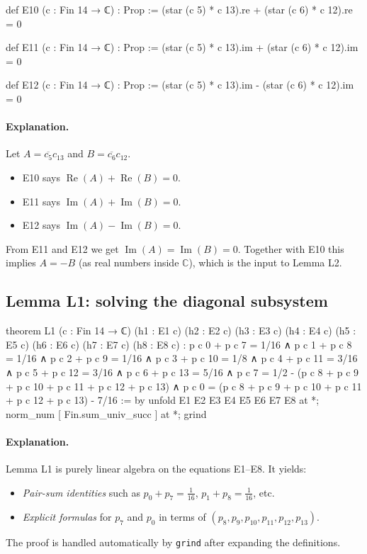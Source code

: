 \documentclass[11pt]{article}
\begin{document}
\begin{LeanCode}
def E10 (c : Fin 14 → ℂ) : Prop :=
  (star (c 5) * c 13).re + (star (c 6) * c 12).re = 0

def E11 (c : Fin 14 → ℂ) : Prop :=
  (star (c 5) * c 13).im + (star (c 6) * c 12).im = 0

def E12 (c : Fin 14 → ℂ) : Prop :=
  (star (c 5) * c 13).im - (star (c 6) * c 12).im = 0
\end{LeanCode}

\paragraph{Explanation.}
Let $A=\overline{c_5}c_{13}$ and $B=\overline{c_6}c_{12}$.
\begin{itemize}
\item E10 says $\operatorname{Re}(A)+\operatorname{Re}(B)=0$.
\item E11 says $\operatorname{Im}(A)+\operatorname{Im}(B)=0$.
\item E12 says $\operatorname{Im}(A)-\operatorname{Im}(B)=0$.
\end{itemize}
From E11 and E12 we get $\operatorname{Im}(A)=\operatorname{Im}(B)=0$.
Together with E10 this implies $A=-B$ (as real numbers inside $\mathbb{C}$), which is the input to Lemma L2.

\subsection*{Lemma L1: solving the diagonal subsystem}

\begin{LeanCode}
theorem L1 (c : Fin 14 → ℂ)
  (h1 : E1 c) (h2 : E2 c) (h3 : E3 c) (h4 : E4 c)
  (h5 : E5 c) (h6 : E6 c) (h7 : E7 c) (h8 : E8 c) :
  p c 0 + p c 7 = 1/16 ∧
  p c 1 + p c 8 = 1/16 ∧
  p c 2 + p c 9 = 1/16 ∧
  p c 3 + p c 10 = 1/8 ∧
  p c 4 + p c 11 = 3/16 ∧
  p c 5 + p c 12 = 3/16 ∧
  p c 6 + p c 13 = 5/16 ∧
  p c 7 = 1/2 - (p c 8 + p c 9 + p c 10 + p c 11 + p c 12 + p c 13) ∧
  p c 0 = (p c 8 + p c 9 + p c 10 + p c 11 + p c 12 + p c 13) - 7/16 := by
  unfold E1 E2 E3 E4 E5 E6 E7 E8 at *; norm_num [ Fin.sum_univ_succ ] at *;
  grind
\end{LeanCode}

\paragraph{Explanation.}
Lemma L1 is purely linear algebra on the equations E1--E8.
It yields:
\begin{itemize}
\item \emph{Pair-sum identities} such as $p_0+p_7=\frac1{16}$, $p_1+p_8=\frac1{16}$, etc.
\item \emph{Explicit formulas} for $p_7$ and $p_0$ in terms of $(p_8,p_9,p_{10},p_{11},p_{12},p_{13})$.
\end{itemize}
The proof is handled automatically by \texttt{grind} after expanding the definitions.
\end{document}
